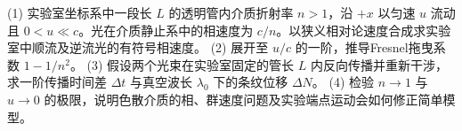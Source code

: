 (1) 实验室坐标系中一段长 \(L\) 的透明管内介质折射率 \(n>1\)，沿 \(+x\) 以匀速 \(u\) 流动且 \(0<u\ll c\)。光在介质静止系中的相速度为 \(c/n\)。以狭义相对论速度合成求实验室中顺流及逆流光的有符号相速度。
(2) 展开至 \(u/c\) 的一阶，推导Fresnel拖曳系数 \(1-1/n^2\)。
(3) 假设两个光束在实验室固定的管长 \(L\) 内反向传播并重新干涉，求一阶传播时间差 \(\Delta t\) 与真空波长 \(\lambda_0\) 下的条纹位移 \(\Delta N\)。
(4) 检验 \(n\to1\) 与 \(u\to0\) 的极限，说明色散介质的相、群速度问题及实验端点运动会如何修正简单模型。
